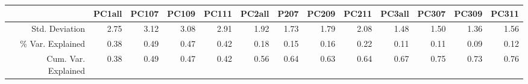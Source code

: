 \begin{table}[ht]
\centering
\begin{tabular}{rrrrrrrrrrrrr}
  \hline
 & PC1all & PC107 & PC109 & PC111 & PC2all & P207 & PC209 & PC211 & PC3all & PC307 & PC309 & PC311 \\ 
  \hline
Std. Deviation & 2.75 & 3.12 & 3.08 & 2.91 & 1.92 & 1.73 & 1.79 & 2.08 & 1.48 & 1.50 & 1.36 & 1.56 \\ 
  \% Var. Explained & 0.38 & 0.49 & 0.47 & 0.42 & 0.18 & 0.15 & 0.16 & 0.22 & 0.11 & 0.11 & 0.09 & 0.12 \\ 
  Cum. Var. Explained & 0.38 & 0.49 & 0.47 & 0.42 & 0.56 & 0.64 & 0.63 & 0.64 & 0.67 & 0.75 & 0.73 & 0.76 \\ 
   \hline
\end{tabular}
\end{table}
